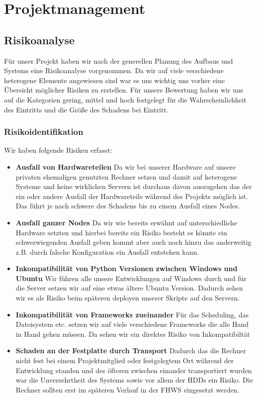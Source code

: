 \documentclass[12pt,oneside,a4paper,parskip]{scrbook}
\begin{document}
\chapter{Projektmanagement}
\section{Risikoanalyse}
Für unser Projekt haben wir nach der generellen Planung des Aufbaus und Systems eine Risikoanalyse vorgenommen. Da wir auf viele verschiedene heterogene Elemente angewiesen sind war es uns wichtig uns vorher eine Übersicht möglicher Risiken zu erstellen. Für unsere Bewertung haben wir uns auf die Kategorien {gering, mittel und hoch} festgelegt für die Wahrscheinlichkeit des Eintritts und die Größe des Schadens bei Eintritt.
\subsection{Risikoidentifikation}
Wir haben folgende Risiken erfasst:

\begin{itemize}
\item\textbf{Ausfall von Hardwareteilen}
Da wir bei unserer Hardware auf unsere privaten ehemaligen genutzten Rechner setzen und damit auf heterogene Systeme und keine wirklichen Servern ist durchaus davon auszugehen das der ein oder andere Ausfall der Hardwareteile während des Projekts möglich ist. Das führt je nach schwere des Schadens bis zu einem Ausfall eines Nodes.
\item\textbf{Ausfall ganzer Nodes}
Da wir wie bereits erwähnt auf unterschiedliche Hardware setzten und hierbei bereits ein Risiko besteht es könnte ein schwerwiegenden Ausfall geben kommt aber auch noch hinzu das anderweitig z.B. durch falsche Konfiguration ein Ausfall entstehen kann.
\item\textbf{Inkompatibilität von Python Versionen zwischen Windows und Ubuntu}
Wir führen alle unsere Entwicklungen auf Windows durch und für die Server setzen wir auf eine etwas ältere Ubuntu Version. Dadurch sehen wir es als Risiko beim späteren deployen unserer Skripte auf den Servern.
\item\textbf{Inkompatibilität von Frameworks zueinander}
Für das Scheduling, das Dateisystem etc. setzen wir auf viele verschiedene Frameworks die alle Hand in Hand gehen müssen. Da sehen wir ein direktes Risiko von Inkompatibiltät
\item\textbf{Schaden an der Festplatte durch Transport}
Dadurch das die Rechner nicht fest bei einem Projektmitglied oder festgelegtem Ort während der Entwicklung standen und des öfteren zwischen einander
transportiert wurden war die Unversehrtheit des Systems sowie vor allem der HDDs ein Risiko. Die Rechner sollten erst im späteren Verlauf in der FHWS eingesetzt werden.
\end{itemize}
\end{document}
